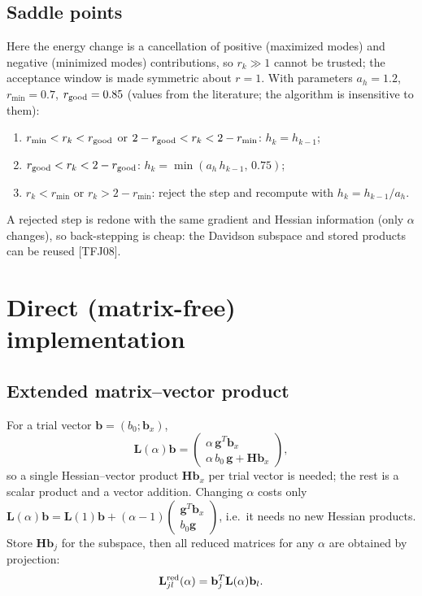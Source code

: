 \documentclass[11pt,a4paper]{article}
\newcommand{\bH}{\mathbf{H}}
\newcommand{\bL}{\mathbf{L}}
\newcommand{\bg}{\mathbf{g}}
\newcommand{\bb}{\mathbf{b}}
\begin{document}
\subsection{Saddle points}
Here the energy change is a cancellation of positive (maximized modes) and negative (minimized modes) contributions, so $r_k\gg1$ cannot be trusted; the acceptance window is made symmetric about $r=1$. With parameters $a_h=1.2$, $r_{\min}=0.7$, $r_{\rm good}=0.85$ (values from the literature; the algorithm is insensitive to them):
\begin{enumerate}[nosep,label=(\roman*)]
 \item $r_{\min}<r_k<r_{\rm good}$ or $2-r_{\rm good}<r_k<2-r_{\min}$: $h_k=h_{k-1}$;
 \item $r_{\rm good}<r_k<2-r_{\rm good}$: $h_k=\min(a_h\,h_{k-1},\,0.75)$;
 \item $r_k<r_{\min}$ or $r_k>2-r_{\min}$: reject the step and recompute with $h_k=h_{k-1}/a_h$.
\end{enumerate}
A rejected step is redone with the same gradient and Hessian information (only $\alpha$ changes), so back-stepping is cheap: the Davidson subspace and stored products can be reused [TFJ08].

\section{Direct (matrix-free) implementation}\label{sec:direct}
\subsection{Extended matrix--vector product}
For a trial vector $\bb=(b_0;\bb_x)$,
\begin{equation}
 \bL(\alpha)\bb=\begin{pmatrix}\alpha\,\bg^T\bb_x\\ \alpha\,b_0\,\bg+\bH\bb_x\end{pmatrix},
\end{equation}
so a single Hessian--vector product $\bH\bb_x$ per trial vector is needed; the rest is a scalar product and a vector addition. Changing $\alpha$ costs only $\bL(\alpha)\bb=\bL(1)\bb+(\alpha-1)\begin{pmatrix}\bg^T\bb_x\\ b_0\bg\end{pmatrix}$, i.e.\ it needs no new Hessian products. Store $\bH\bb_j$ for the subspace, then all reduced matrices for any $\alpha$ are obtained by projection:
\begin{equation}
 \bL^{\rm red}_{jl}(\alpha)=\bb_j^T\bL(\alpha)\bb_l .
\end{equation}
\end{document}
